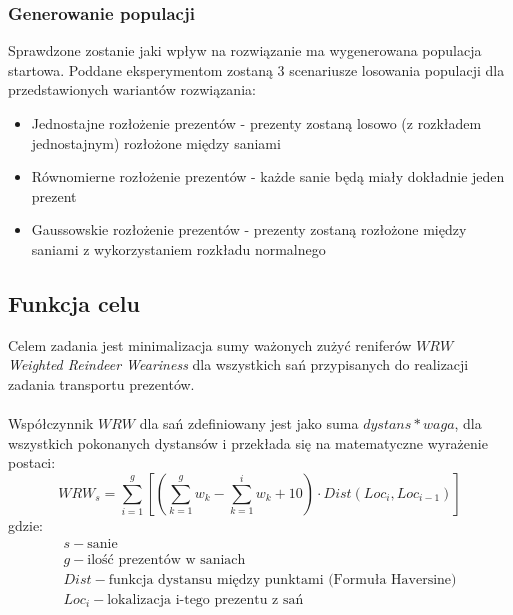 \documentclass[titlepage]{article}
\begin{document}
            \subsubsection{
                Generowanie populacji
            }
                Sprawdzone zostanie jaki wpływ na rozwiązanie ma wygenerowana populacja startowa. 
                Poddane eksperymentom zostaną 3 scenariusze losowania populacji dla przedstawionych wariantów rozwiązania:

                \begin{itemize}
                    \item Jednostajne rozłożenie prezentów - prezenty zostaną losowo (z rozkładem jednostajnym) rozłożone między saniami
                    \item Równomierne rozłożenie prezentów - każde sanie będą miały dokładnie jeden prezent
                    \item Gaussowskie rozłożenie prezentów - prezenty zostaną rozłożone między saniami z wykorzystaniem rozkładu normalnego
                \end{itemize}

        \subsection{
            Funkcja celu
        }
            Celem zadania jest minimalizacja sumy ważonych zużyć reniferów $WRW$ \textit{Weighted Reindeer Weariness}
            dla wszystkich sań przypisanych do realizacji zadania transportu prezentów. \\ \\
            Współczynnik $WRW$ dla sań zdefiniowany jest jako suma $dystans * waga$,
            dla wszystkich pokonanych dystansów i przekłada się na matematyczne wyrażenie postaci:
            \[
                WRW_{s} = \sum^{g}_{i=1} [
                    (
                        \sum^{g}_{k=1} w_{k} - 
                        \sum^{i}_{k=1} w_{k} + 10
                    ) \cdot
                    Dist(Loc_{i}, Loc_{i-1})
                ]
            \]
            gdzie:
            \[
                \begin{array}{l}
                    s - \mbox{sanie} \\
                    g - \mbox{ilość prezentów w saniach} \\
                    Dist - \mbox{funkcja dystansu między punktami (Formuła Haversine)} \\
                    Loc_{i} - \mbox{lokalizacja i-tego prezentu z sań} \\
                \end{array}
            \]
            \\
\end{document}
